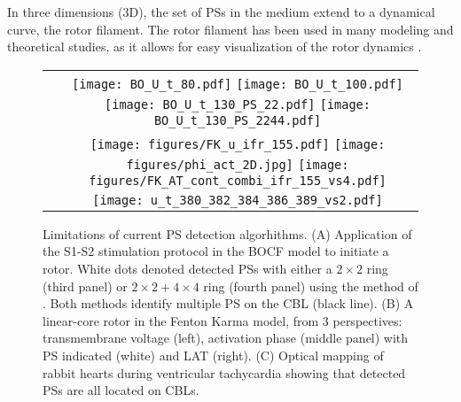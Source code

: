\documentclass{article}
\begin{document}
In three dimensions (3D), the set of PSs in the medium extend to a dynamical curve, the rotor filament. The rotor filament has been used in many modeling and theoretical studies, as it allows for easy visualization of the rotor dynamics \citep{Clayton:2005,Wellner:2002, Verschelde:2007,Dierckx:2012}. 

\begin{figure}
 \begin{tabular}{ c c}
\raisebox{3.1cm}{\textbf{A}}  &  \texttt{[image: BO\_U\_t\_80.pdf]}
 \texttt{[image: BO\_U\_t\_100.pdf]}
     \texttt{[image: BO\_U\_t\_130\_PS\_22.pdf]}
    \texttt{[image: BO\_U\_t\_130\_PS\_2244.pdf]} 
 \\
\raisebox{4.1cm}{\textbf{B}}  &  \texttt{[image: figures/FK\_u\_ifr\_155.pdf]}
   \texttt{[image: figures/phi\_act\_2D.jpg]}
    \texttt{[image: figures/FK\_AT\_cont\_combi\_ifr\_155\_vs4.pdf]}\\
    \raisebox{5cm}{\textbf{C}}&
    \texttt{[image: u\_t\_380\_382\_384\_386\_389\_vs2.pdf]}
 
\end{tabular}
    \caption{Limitations of current PS detection algorhithms. (A) Application of the S1-S2 stimulation protocol in the BOCF \citep{BuenoOrovio:2008} model to initiate a rotor. White dots denoted detected PSs with either a $2\times2$ ring (third panel) or $2\times2+4\times4$ ring (fourth panel) using the method of \cite{Kuklik:2017}. Both methods identify multiple PS on the CBL (black line). %
     (B) A linear-core rotor in the Fenton Karma model, from 3 perspectives: transmembrane voltage (left), activation phase (middle panel) with PS indicated (white) and LAT (right). (C) Optical mapping of rabbit hearts during ventricular tachycardia showing that detected PSs are all located on CBLs.}
    \label{fig:problems}
\end{figure}
\end{document}
